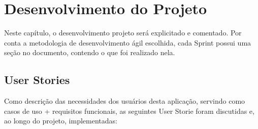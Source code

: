 

\chapter[Desenvolvimento do Projeto]{Desenvolvimento do Projeto}
Neste capítulo, o desenvolvimento projeto será explicitado e comentado. Por conta a metodologia de desenvolvimento ágil escolhida, cada Sprint possui uma seção no documento, contendo o que foi realizado nela.

\section{User Stories}
Como descrição das necessidades dos usuários desta aplicação, servindo como casos de uso + requisitos funcionais, as seguintes User Storie foram discutidas e, ao longo do projeto, implementadas:

